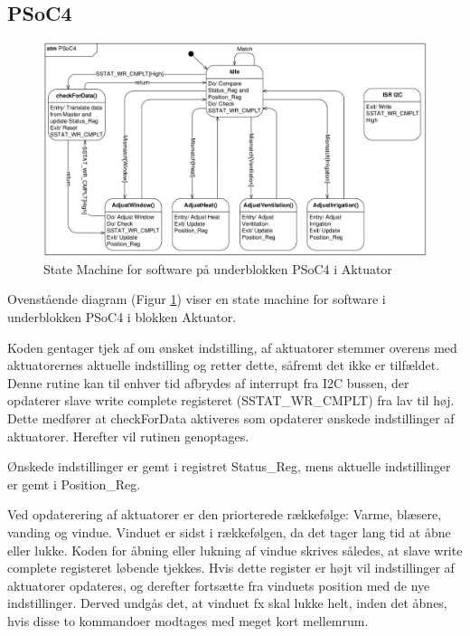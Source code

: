 \clearpage

\subsection{PSoC4}

\begin{figure}[h]
\centering 
\includegraphics[width={\textwidth}, trim=0 0 0 0, clip=true] {../fig/stm_psoc_aktuator.pdf}
\caption{State Machine for software på underblokken PSoC4 i Aktuator}
\label{fig:stm_psoc_aktuator}
\end{figure}

Ovenstående diagram (Figur \ref{fig:stm_psoc_aktuator}) viser en state machine for software i underblokken PSoC4 i blokken Aktuator. 

Koden gentager tjek af om ønsket indstilling, af aktuatorer stemmer overens med aktuatorernes aktuelle indstilling og retter dette, såfremt det ikke er tilfældet. 
Denne rutine kan til enhver tid afbrydes af interrupt fra I2C bussen, der opdaterer slave write complete registeret (SSTAT\_WR\_CMPLT) fra lav til høj. Dette medfører at checkForData aktiveres som opdaterer ønskede indstillinger af aktuatorer. Herefter vil rutinen genoptages.
 
Ønskede indstillinger er gemt i registret Status\_Reg, mens aktuelle indstillinger er gemt i Position\_Reg.
 
Ved opdaterering af aktuatorer er den priorterede rækkefølge: Varme, blæsere, vanding og vindue. 
Vinduet er sidst i rækkefølgen, da det tager lang tid at åbne eller lukke. Koden for åbning eller lukning af vindue skrives således, at slave write complete registeret løbende tjekkes. Hvis dette register er højt vil indstillinger af aktuatorer opdateres, og derefter fortsætte fra vinduets position med de nye indstillinger.
Derved undgås det, at vinduet fx skal lukke helt, inden det åbnes, hvis disse to kommandoer modtages med meget kort mellemrum. 

